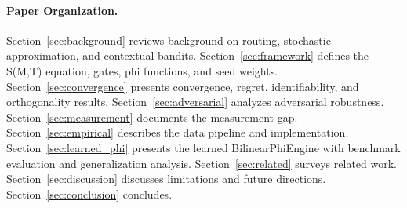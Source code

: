 \paragraph{Paper Organization.}
Section~\ref{sec:background} reviews background on routing, stochastic approximation, and contextual bandits. Section~\ref{sec:framework} defines the S(M,T) equation, gates, phi functions, and seed weights. Section~\ref{sec:convergence} presents convergence, regret, identifiability, and orthogonality results. Section~\ref{sec:adversarial} analyzes adversarial robustness. Section~\ref{sec:measurement} documents the measurement gap. Section~\ref{sec:empirical} describes the data pipeline and implementation. Section~\ref{sec:learned_phi} presents the learned BilinearPhiEngine with benchmark evaluation and generalization analysis. Section~\ref{sec:related} surveys related work. Section~\ref{sec:discussion} discusses limitations and future directions. Section~\ref{sec:conclusion} concludes.
